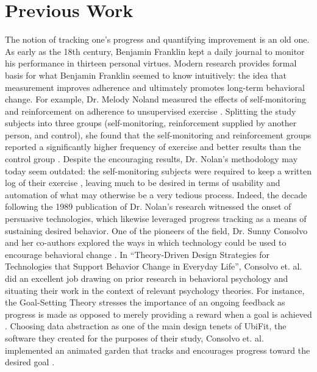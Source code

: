 \documentclass{sigchi}
\begin{document}
\section{Previous Work}
The notion of tracking one’s progress and quantifying improvement is an old one. As early as the 18th century, Benjamin Franklin kept a daily journal to monitor his performance in thirteen personal virtues. 
Modern research provides formal basis for what Benjamin Franklin seemed to know intuitively: the idea that measurement improves adherence and ultimately promotes long-term behavioral change. For example, Dr. Melody Noland measured the effects of self-monitoring and reinforcement on adherence to unsupervised exercise
\cite{Noland1989Effects}. 
Splitting the study subjects into three groups (self-monitoring, reinforcement supplied by another person, and control), she found that the self-monitoring and reinforcement groups reported a significantly higher frequency of exercise and better results than the control group 
\cite{Noland1989Effects}. %
Despite the encouraging results, Dr. Nolan’s methodology may today seem outdated: the self-monitoring subjects were required to keep a written log of their exercise
\cite{Noland1989Effects}, %
leaving much to be desired in terms of usability and automation of what may otherwise be a very tedious process. Indeed, the decade following the 1989 publication of Dr. Nolan’s research witnessed the onset of persuasive technologies, which likewise leveraged progress tracking as a means of sustaining desired behavior. 
One of the pioneers of the field, Dr. Sunny Consolvo and her co-authors explored the ways in which technology could be used to encourage behavioral change
\cite{Consolvo2009Theory, Consolvo2008Flowers}. %
In “Theory-Driven Design Strategies for Technologies that Support Behavior Change in Everyday Life”, Consolvo et. al. did an excellent job drawing on prior research in behavioral psychology and situating their work in the context of relevant psychology theories. For instance, the Goal-Setting Theory stresses the importance of an ongoing feedback as progress is made as opposed to merely providing a reward when a goal is achieved 
\cite{Consolvo2009Theory}. %
Choosing data abstraction as one of the main design tenets of UbiFit, the software they created for the purposes of their study, Consolvo et. al. implemented an animated garden that tracks and encourages progress toward the desired goal 
\cite{Consolvo2009Theory, Consolvo2008Flowers}. %
\end{document}
